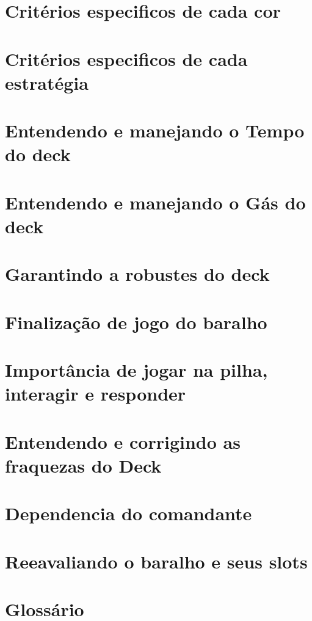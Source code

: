 \documentclass[12pt, a4paper]{article}
\begin{document}
    \section{Critérios especificos de cada cor}
    

    \section{Critérios especificos de cada estratégia}
    

    \section{Entendendo e manejando o Tempo do deck}
    

    \section{Entendendo e manejando o Gás do deck}
    

    \section{Garantindo a robustes do deck}
    

    \section{Finalização de jogo do baralho}
    

    \section{Importância de jogar na pilha, interagir e responder}
    

    \section{Entendendo e corrigindo as fraquezas do Deck}
    

    \section{Dependencia do comandante}
    

    \section{Reeavaliando o baralho e seus slots}
    

    \section{Glossário}
    

    
\end{document}
